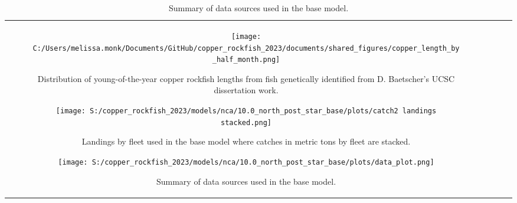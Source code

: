 \documentclass[11pt,
  letterpaper,
]{article}
\begin{document}
\begin{longtable}[t]{c>{\centering\arraybackslash}p{2cm}>{\centering\arraybackslash}p{2cm}>{\centering\arraybackslash}p{2cm}}
\begin{figure}
{\centering
\texttt{[image: C:/Users/melissa.monk/Documents/GitHub/copper\_rockfish\_2023/documents/shared\_figures/copper\_length\_by\_half\_month.png]}
}
\caption{Distribution of young-of-the-year copper rockfish lengths from fish genetically identified from D. Baetscher's UCSC dissertation work.\label{fig:copper-smurf-length}}
\end{figure}

\pagebreak

\begin{figure}
{\centering
\texttt{[image: S:/copper\_rockfish\_2023/models/nca/10.0\_north\_post\_star\_base/plots/catch2 landings stacked.png]}
}
\caption{Landings by fleet used in the base model where catches in metric tons by fleet are stacked.\label{fig:catch}}
\end{figure}

\pagebreak

\begin{figure}
{\centering
\texttt{[image: S:/copper\_rockfish\_2023/models/nca/10.0\_north\_post\_star\_base/plots/data\_plot.png]}
}
\caption{Summary of data sources used in the base model.\label{fig:data-plot}}
\end{figure}


\end{longtable}
\end{document}
